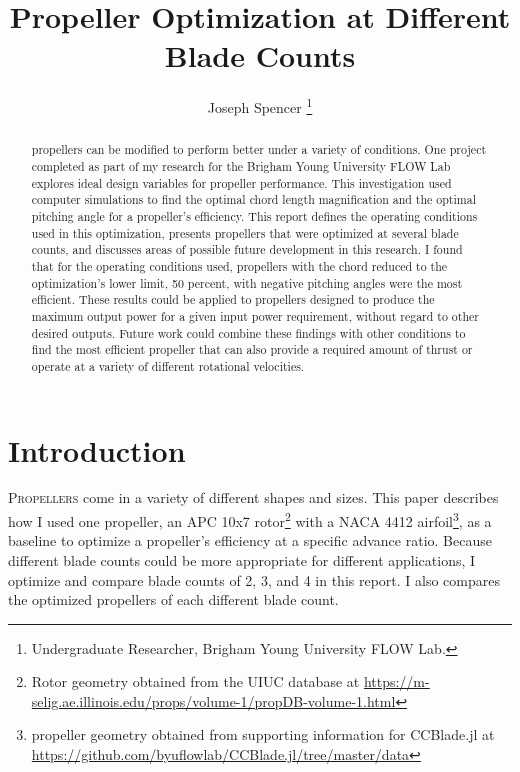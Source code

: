 \documentclass[journal ]{new-aiaa}
\title{Propeller Optimization at Different Blade Counts}
\author{Joseph Spencer \footnote{Undergraduate Researcher, Brigham Young University FLOW Lab.}}
\affil{Brigham Young University, Provo, Utah, 84601}
\begin{document}
\maketitle

\begin{abstract}

propellers can be modified to perform better under a variety of conditions. One project completed as part of my research for the Brigham Young University FLOW Lab explores ideal design variables for propeller performance. This investigation used computer simulations to find the optimal chord length magnification and the optimal pitching angle for a propeller's efficiency. This report defines the operating conditions used in this optimization, presents propellers that were optimized at several blade counts, and discusses areas of possible future development in this research. I found that for the operating conditions used, propellers with the chord reduced to the optimization's lower limit, 50 percent, with negative pitching angles were the most efficient. These results could be applied to propellers designed to produce the maximum output power for a given input power requirement, without regard to other desired outputs. Future work could combine these findings with other conditions to find the most efficient propeller that can also provide a required amount of thrust or operate at a variety of different rotational velocities.

\end{abstract}


\section{Introduction}

\lettrine{P}{ropellers} come in a variety of different shapes and sizes. This paper describes how I used one propeller, an APC 10x7 rotor\footnote{Rotor geometry obtained from the UIUC database at \url{https://m-selig.ae.illinois.edu/props/volume-1/propDB-volume-1.html}} with a NACA 4412 airfoil\footnote{propeller geometry obtained from supporting information for CCBlade.jl at \url{https://github.com/byuflowlab/CCBlade.jl/tree/master/data}}, as a baseline to optimize a propeller's efficiency at a specific advance ratio. Because different blade counts could be more appropriate for different applications, I optimize and compare blade counts of 2, 3, and 4 in this report. I also compares the optimized propellers of each different blade count.
\end{document}
